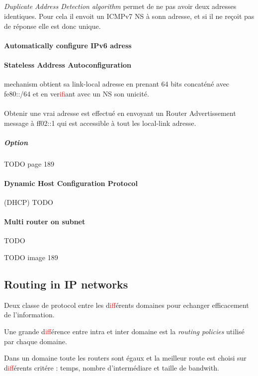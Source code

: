 \subparagraph{ }
\textit{Duplicate Address Detection algorithm} permet de ne pas avoir deux adresses identiques.
Pour cela il envoit un ICMPv7 NS à sonn adresse, et si il ne reçoit pas de réponse elle est
donc unique.

\paragraph{Automatically configure IPv6 adress}
\paragraph{Stateless Address Autoconfiguration} mechanism obtient sa link-local adresse
en prenant 64 bits concaténé avec fe80::/64 et en ver\textcolor{red}{if}iant avec un NS son unicité.

\paragraph{ }
Obtenir  une   vrai  adresse  est   effectué  en  envoyant   un  Router
Advertissement  message  à  ff02::1  qui est  accessible  à  tout  les
local-link adresse.

\subparagraph{Option}
TODO page 189

\paragraph{Dynamic Host Configuration Protocol} (DHCP)
TODO

\paragraph{Multi router on subnet}
TODO



TODO image 189

\subsection{Routing in IP networks}
Deux classe de protocol entre les d\textcolor{red}{if}férents domaines pour echanger
efficacement de l'information.

Une grande d\textcolor{red}{if}férence entre intra et inter domaine est la \textit{routing policies}
utilisé par chaque domaine.

Dans un domaine toute les routers sont égaux et la meilleur route est choisi sur
d\textcolor{red}{if}férents critére : temps, nombre d'intermédiare et taille de bandwith.

